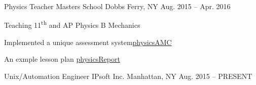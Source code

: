 \begin{cventries}
  \cventry
    {Physics Teacher} %
    {Masters School} %
    {Dobbs Ferry, NY} %
    {Aug. 2015 -- Apr. 2016} %
    {
      \begin{cvitems} %
      \item {Teaching 11\textsuperscript{th} and AP Physics B Mechanics}
      \item {Implemented a unique assessment system\href{jphafner.github.com/physicsAMC}{physicsAMC}}
      \item {An exmple lesson plan \href{jphafner.github.com/physiscsReport}{physicsReport}}
      \end{cvitems}
    }
  \cventry
    {Unix/Automation Engineer} %
    {IPsoft Inc.} %
    {Manhattan, NY} %
    {Aug. 2015 -- PRESENT} %
    {
      \begin{cvitems} %
        \item {}
      \end{cvitems}
    }

\end{cventries}

